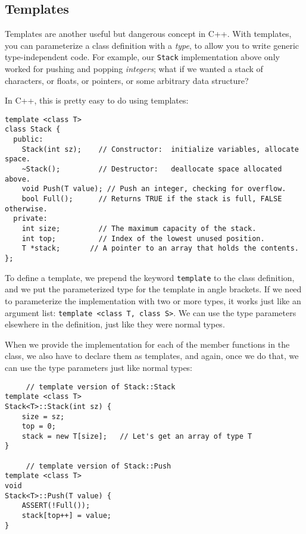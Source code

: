 \subsection{Templates}

Templates are another useful but dangerous concept in C++.
With templates, you can parameterize a class definition
with a {\em type}, to allow you to write generic type-independent
code.  For example, our {\tt Stack} implementation above only worked 
for pushing and popping {\em integers}; what if we wanted a stack 
of characters, or floats, or pointers, or some arbitrary data structure?

In C++, this is pretty easy to do using templates:

\begin{verbatim}
template <class T> 
class Stack {
  public:
    Stack(int sz);    // Constructor:  initialize variables, allocate space.
    ~Stack();         // Destructor:   deallocate space allocated above.
    void Push(T value); // Push an integer, checking for overflow.
    bool Full();      // Returns TRUE if the stack is full, FALSE otherwise.
  private:
    int size;         // The maximum capacity of the stack.
    int top;          // Index of the lowest unused position.
    T *stack;       // A pointer to an array that holds the contents.
};
\end{verbatim}

To define a template, we prepend the keyword {\tt template} to
the class definition, and we put the parameterized type for the
template in angle brackets.  If we need to parameterize the implementation
with two or more types, it works just like an argument list:
{\tt template <class T, class S>}.  We can use the type parameters
elsewhere in the definition, just like they were normal types.

When we provide the implementation for each of the member functions
in the class, we also have to declare them as templates, and again,
once we do that, we can use the type parameters just like normal types:

\begin{verbatim}
     // template version of Stack::Stack
template <class T> 
Stack<T>::Stack(int sz) {
    size = sz;
    top = 0;
    stack = new T[size];   // Let's get an array of type T
}

     // template version of Stack::Push
template <class T> 
void
Stack<T>::Push(T value) {
    ASSERT(!Full());
    stack[top++] = value;
}
\end{verbatim}

